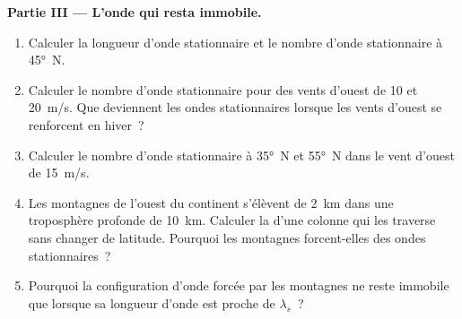 \begin{problem}
\medskip\noindent\textbf{Partie III --- L'onde qui resta immobile.}
\begin{enumerate}[resume]
\item Calculer la longueur d'onde stationnaire et le nombre d'onde stationnaire à
  \ang{45}~N.
\item Calculer le nombre d'onde stationnaire pour des vents d'ouest de 10 et
  \qty{20}{m/s}. Que deviennent les ondes stationnaires lorsque les vents d'ouest
  se renforcent en hiver~?
\item Calculer le nombre d'onde stationnaire à \ang{35}~N et \ang{55}~N dans le
  vent d'ouest de \qty{15}{m/s}.
\item Les montagnes de l'ouest du continent s'élèvent de \qty{2}{km} dans une
  troposphère profonde de \qty{10}{km}. Calculer la  d'une colonne
  qui les traverse sans changer de latitude. Pourquoi les montagnes forcent-elles
  des ondes stationnaires~?
\item Pourquoi la configuration d'onde forcée par les montagnes ne reste immobile
  que lorsque sa longueur d'onde est proche de $\lambda_s$~?
\end{enumerate}


\end{problem}
